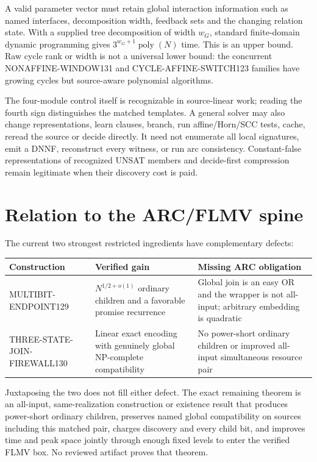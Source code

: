\documentclass[11pt]{article}
\begin{document}
A valid parameter vector must retain global interaction information such as
named interfaces, decomposition width, feedback sets and the changing
relation state.  With a supplied tree decomposition of width $w_G$, standard
finite-domain dynamic programming gives $3^{w_G+1}\operatorname{poly}(N)$
time.  This is an upper bound.  Raw cycle rank or width is not a universal
lower bound: the concurrent NONAFFINE-WINDOW131 and CYCLE-AFFINE-SWITCH123
families have growing cycles but source-aware polynomial algorithms.

The four-module control itself is recognizable in source-linear work; reading
the fourth sign distinguishes the matched templates.  A general solver may
also change representations, learn clauses, branch, run affine/Horn/SCC
tests, cache, reread the source or decide directly.  It need not enumerate all
local signatures, emit a DNNF, reconstruct every witness, or run arc
consistency.  Constant-false representations of recognized UNSAT members and
decide-first compression remain legitimate when their discovery cost is paid.

\section{Relation to the ARC/FLMV spine}
The current two strongest restricted ingredients have complementary defects:
\begin{center}
\begin{tabular}{p{.25\linewidth}p{.31\linewidth}p{.31\linewidth}}
\toprule
Construction & Verified gain & Missing ARC obligation\\\midrule
MULTIBIT-ENDPOINT129 & $N^{1/2+o(1)}$ ordinary children and a favorable
promise recurrence & Global join is an easy OR and the wrapper is not
all-input; arbitrary embedding is quadratic\\
THREE-STATE-JOIN-FIREWALL130 & Linear exact encoding with genuinely global
NP-complete compatibility & No power-short ordinary children or improved
all-input simultaneous resource pair\\
\bottomrule
\end{tabular}
\end{center}
Juxtaposing the two does not fill either defect.  The exact remaining theorem
is an all-input, same-realization construction or existence result that
produces power-short ordinary children, preserves named global compatibility
on sources including this matched pair, charges discovery and every child
bit, and improves time and peak space jointly through enough fixed levels to
enter the verified FLMV box.  No reviewed artifact proves that theorem.
\end{document}
